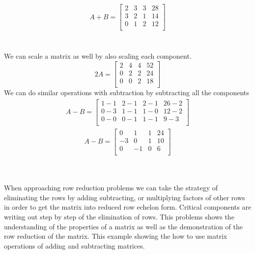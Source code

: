 \documentclass[12pt]{article}
\begin{document}
  \begin{align*}
A +B = \begin{bmatrix}
 2 & 3 & 3 & 28 \\
  3 & 2 & 1 & 14 \\
 0& 1 & 2 & 12 \\
 \end{bmatrix}
  \end{align*}
  \\\\ We can scale a matrix as well by also scaling each component.
  \begin{equation*}2A = \begin{bmatrix}2& 4 &4 &52 \\ 
  0& 2 &2 &24 \\
  0& 0 &2 &18 \\
  \end{bmatrix}\end{equation*}
We can do similar operations with subtraction by subtracting all the components
\begin{align*}
  A -B = \begin{bmatrix}
 1-1 & 2-1 & 2-1 & 26-2 \\
  0-3 & 1-1 & 1-0 & 12-2 \\
 0-0 & 0-1 & 1-1 & 9-3 \\
 \end{bmatrix}
 \end{align*}
  \begin{align*}
  A -B = \begin{bmatrix}
 0 & 1 &1 & 24 \\
  -3 & 0 & 1 & 10 \\
 0& -1 & 0 & 6 \\
 \end{bmatrix}
\end{align*}\\
\\
\begin{flushleft}
When approaching row reduction problems we can take the strategy of eliminating the rows by adding subtracting, or multiplying factors of other rows in order to get the matrix into reduced row echelon form. Critical components are writing out step by step of the elimination of rows. This problems shows the understanding of the properties of a matrix as well as the demonstration of the row reduction of the matrix. This example showing the how to use matrix operations of adding and subtracting matrices.
\end{flushleft}
\newpage
\end{document}
